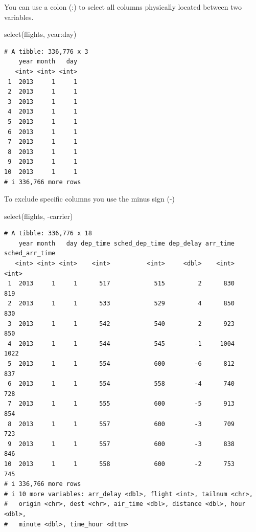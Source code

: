 \documentclass[
  letterpaper,
  DIV=11,
  numbers=noendperiod,
  oneside]{scrreprt}
\newenvironment{Shaded}{\begin{snugshade}}{\end{snugshade}}
\newcommand{\FunctionTok}[1]{\textcolor[rgb]{0.28,0.35,0.67}{#1}}
\newcommand{\NormalTok}[1]{\textcolor[rgb]{0.00,0.23,0.31}{#1}}
\newcommand{\SpecialCharTok}[1]{\textcolor[rgb]{0.37,0.37,0.37}{#1}}
\begin{document}
You can use a colon (:) to select all columns physically located between
two variables.

\begin{Shaded}
\begin{Highlighting}[]
\FunctionTok{select}\NormalTok{(flights, year}\SpecialCharTok{:}\NormalTok{day)}
\end{Highlighting}
\end{Shaded}

\begin{verbatim}
# A tibble: 336,776 x 3
    year month   day
   <int> <int> <int>
 1  2013     1     1
 2  2013     1     1
 3  2013     1     1
 4  2013     1     1
 5  2013     1     1
 6  2013     1     1
 7  2013     1     1
 8  2013     1     1
 9  2013     1     1
10  2013     1     1
# i 336,766 more rows
\end{verbatim}

To exclude specific columns you use the minus sign (-)

\begin{Shaded}
\begin{Highlighting}[]
\FunctionTok{select}\NormalTok{(flights, }\SpecialCharTok{{-}}\NormalTok{carrier)}
\end{Highlighting}
\end{Shaded}

\begin{verbatim}
# A tibble: 336,776 x 18
    year month   day dep_time sched_dep_time dep_delay arr_time sched_arr_time
   <int> <int> <int>    <int>          <int>     <dbl>    <int>          <int>
 1  2013     1     1      517            515         2      830            819
 2  2013     1     1      533            529         4      850            830
 3  2013     1     1      542            540         2      923            850
 4  2013     1     1      544            545        -1     1004           1022
 5  2013     1     1      554            600        -6      812            837
 6  2013     1     1      554            558        -4      740            728
 7  2013     1     1      555            600        -5      913            854
 8  2013     1     1      557            600        -3      709            723
 9  2013     1     1      557            600        -3      838            846
10  2013     1     1      558            600        -2      753            745
# i 336,766 more rows
# i 10 more variables: arr_delay <dbl>, flight <int>, tailnum <chr>,
#   origin <chr>, dest <chr>, air_time <dbl>, distance <dbl>, hour <dbl>,
#   minute <dbl>, time_hour <dttm>
\end{verbatim}
\end{document}
